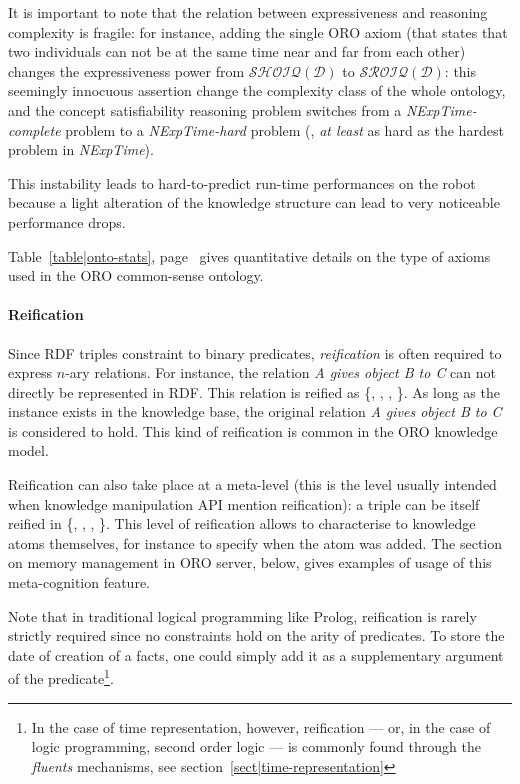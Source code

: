 It is important to note that the relation between expressiveness and reasoning
complexity is fragile: for instance, adding  the single ORO axiom
 (that states that two individuals can not
be at the same time near and far from each other) changes the expressiveness
power from $\mathcal{SHOIQ(D)}$ to $\mathcal{SROIQ(D)}$: this seemingly
innocuous assertion change the complexity class of the whole ontology, and the
concept satisfiability reasoning problem switches from a {\it
NExpTime-complete} problem to a {\it NExpTime-hard} problem (\ie, \emph{at
least} as hard as the hardest problem in {\it NExpTime}).

This instability leads to hard-to-predict run-time performances on the robot
because a light alteration of the knowledge structure can lead to very
noticeable performance drops.

Table~\ref{table|onto-stats}, page~\pageref{table|onto-stats} gives
quantitative details on the type of axioms used in the ORO common-sense
ontology.

\paragraph{Reification} Since RDF triples constraint to binary predicates,
\emph{reification} is often required to express $n$-ary relations. For
instance, the relation \emph{A gives object B to C} can not directly be
represented in RDF. This relation is reified as \{,
, , \}. As
long as the instance  exists in the knowledge base, the original
relation \emph{A gives object B to C} is considered to hold. This kind of
reification is common in the ORO knowledge model.

Reification can also take place at a meta-level (this is the level usually
intended when knowledge manipulation API mention reification): a triple
 can be itself reified in \{, , , \}. This level of reification allows
to characterise to knowledge atoms themselves, for instance to specify when the
atom was added. The section on memory management in ORO server, below, gives
examples of usage of this meta-cognition feature.

Note that in traditional logical programming like Prolog, reification is rarely
strictly required since no constraints hold on the arity of predicates. To
store the date of creation of a facts, one could simply add it as a
supplementary argument of the predicate\footnote{In the case of time
representation, however, reification --- or, in the case of logic programming,
second order logic --- is commonly found through the \emph{fluents} mechanisms,
see section~\ref{sect|time-representation}}.

